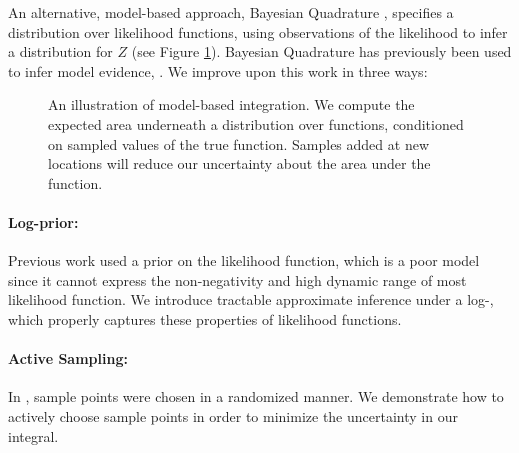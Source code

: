 \documentclass{article}
\begin{document}
An alternative, model-based approach, Bayesian Quadrature \citep{BZHermiteQuadrature}, specifies a distribution over likelihood functions, using observations of the likelihood to infer a distribution for $Z$ (see Figure \ref{fig:model_based}). Bayesian Quadrature has previously been used to infer model evidence, \citep{BZMonteCarlo}.  We improve upon this work in three ways:

\begin{figure}
\centering
{}
\caption{An illustration of model-based integration.  We compute the expected area underneath a distribution over functions, conditioned on sampled values of the true function.  Samples added at new locations will reduce our uncertainty about the area under the function.}
\label{fig:model_based}
\end{figure}




\paragraph*{Log-prior:} Previous work used a \gpb prior on the likelihood function, which is a poor model since it cannot express the non-negativity and high dynamic range of most likelihood function.  We introduce tractable approximate inference under a log-\gp, which properly captures these properties of likelihood functions.


\paragraph*{Active Sampling:} In \citep{BZMonteCarlo}, sample points were chosen in a randomized manner.  We demonstrate how to actively choose sample points in order to minimize the uncertainty in our integral.
\end{document}
